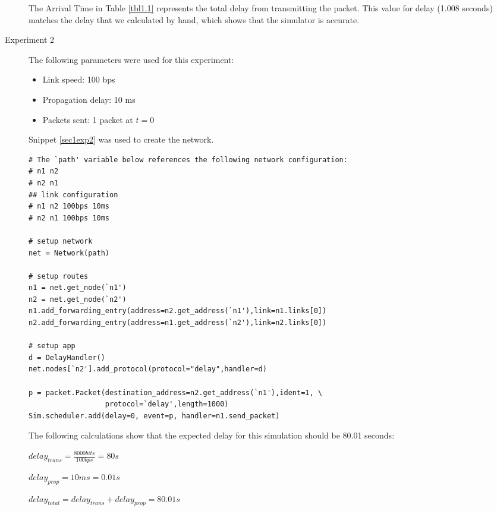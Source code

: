\documentclass[11pt]{article}
\begin{document}
\begin{description}
\smallskip

The Arrival Time in Table \ref{tbl1.1} represents the total delay from transmitting the packet. This value for delay (1.008 seconds) matches the delay that we calculated by hand, which shows that the simulator is accurate.

\item[Experiment 2] \hfill \break
The following parameters were used for this experiment:

\begin{itemize}
\item Link speed: 100 bps
\item Propagation delay: 10 ms
\item Packets sent: 1 packet at $t = 0$
\end{itemize}

\medskip

Snippet \ref{sec1exp2} was used to create the network.

\medskip

\begin{lstlisting}[caption={Network 1.2},label=sec1exp2]
# The `path' variable below references the following network configuration:
# n1 n2
# n2 n1
## link configuration
# n1 n2 100bps 10ms
# n2 n1 100bps 10ms

# setup network
net = Network(path)

# setup routes
n1 = net.get_node(`n1')
n2 = net.get_node(`n2')
n1.add_forwarding_entry(address=n2.get_address(`n1'),link=n1.links[0])
n2.add_forwarding_entry(address=n1.get_address(`n2'),link=n2.links[0])

# setup app
d = DelayHandler()
net.nodes[`n2'].add_protocol(protocol="delay",handler=d)

p = packet.Packet(destination_address=n2.get_address(`n1'),ident=1, \
                  protocol=`delay',length=1000)
Sim.scheduler.add(delay=0, event=p, handler=n1.send_packet)
\end{lstlisting}

The following calculations show that the expected delay for this simulation should be 80.01 seconds:
\begin{addmargin}[1em]{0em}
$delay_{trans} = \frac{8000 bits}{100 bps} = 80s $

$delay_{prop} = 10ms = 0.01s$

$delay_{total} = delay_{trans} + delay_{prop} = 80.01s $
\end{addmargin}

\bigskip


\end{description}
\end{document}
